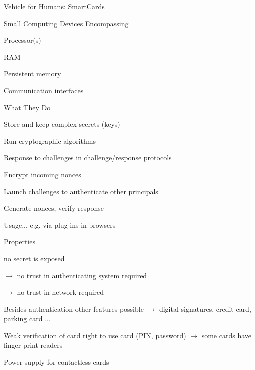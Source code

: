 \documentclass[a4paper]{article}
\begin{document}
\begin{multicols}{3}
    Vehicle for Humans: SmartCards
    \begin{itemize*}
        \item Small Computing Devices Encompassing
        \begin{itemize*}
            \item Processor(s)
            \item RAM
            \item Persistent memory
            \item Communication interfaces
        \end{itemize*}
        \item What They Do
        \begin{itemize*}
            \item Store and keep complex secrets (keys)
            \item Run cryptographic algorithms
            \begin{itemize*}
                \item Response to challenges in challenge/response protocols
                \item Encrypt incoming nonces
            \end{itemize*}
            \item Launch challenges to authenticate other principals
            \begin{itemize*}
                \item Generate nonces, verify response
            \end{itemize*}
        \end{itemize*}
        \item Usage... e.g. via plug-ins in browsers
    \end{itemize*}

    Properties
    \begin{itemize*}
        \item no secret is exposed
        \begin{itemize*}
            \item[$\rightarrow$] no trust in authenticating system required
            \item[$\rightarrow$] no trust in network required
        \end{itemize*}
        \item Besides authentication other features possible $\rightarrow$ digital signatures, credit card, parking card ...
        \item Weak verification of card right to use card (PIN, password) $\rightarrow$ some cards have finger print readers
        \item Power supply for contactless cards
    \end{itemize*}


\end{multicols}
\end{document}
